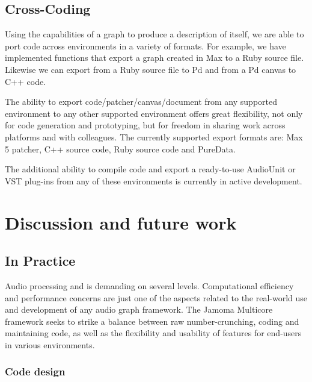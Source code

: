 \documentclass[twoside,a4paper]{article}
\begin{document}


\subsection{Cross-Coding} %

Using the capabilities of a graph to produce a description of itself, we are able to port code across environments in a variety of formats.  
For example, we have implemented functions that export a graph created in Max to a Ruby source file.  
Likewise we can export from a Ruby source file to Pd and from a Pd canvas to C++ code.  

The ability to export code/patcher/canvas/document from any supported environment to any other supported environment offers great flexibility, not only for code generation and prototyping, but for freedom in sharing work across platforms and with colleagues.  
The currently supported export formats are: Max 5 patcher, C++ source code, Ruby source code and PureData.

The additional ability to compile code and export a ready-to-use AudioUnit or VST plug-ins from any of these environments is currently in active development.





%
\section{Discussion and future work} %
%

\subsection{In Practice} %

Audio processing and is demanding on several levels.  Computational efficiency and performance concerns are just one of the aspects related to the real-world use and development of any audio graph framework.  The Jamoma Multicore framework seeks to strike a balance between raw number-crunching, coding and maintaining code, as well as the flexibility and usability of features for end-users in various environments.


\subsubsection{Code design} %
\end{document}
